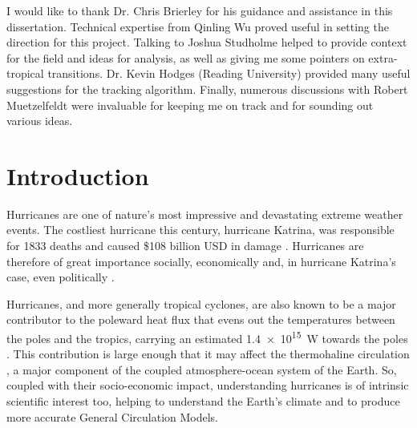 \documentclass[pdftex,12pt,a4paper]{report}
\begin{document}
I would like to thank Dr. Chris Brierley for his guidance and assistance in this dissertation.
Technical expertise from Qinling Wu proved useful in setting the direction for this project.
Talking to Joshua Studholme helped to provide context for the field and ideas for analysis, as well
as giving me some pointers on extra-tropical transitions. %
Dr. Kevin Hodges (Reading University) provided many useful suggestions for the tracking algorithm.
Finally, numerous discussions with Robert Muetzelfeldt were invaluable for keeping me on track and
for sounding out various ideas.

\newpage

\tableofcontents

\chapter{Introduction}


Hurricanes are one of nature's most impressive and devastating extreme weather events. The costliest
hurricane this century, hurricane Katrina, was responsible for 1833 deaths and caused \$108
billion USD in damage \parencite{knabb2006tropical}. %
Hurricanes are therefore of great importance socially,
economically and, in hurricane Katrina's case, even politically \parencite{kellner2007katrina}.

Hurricanes, and more generally tropical cyclones, are also known to be a major contributor to the
poleward heat flux that evens out the temperatures between the poles and the tropics, carrying an
estimated \SI{1.4e15}{W} towards the poles \parencite{emanuelContribution2001}. This
contribution is large enough that it may affect the thermohaline circulation
\parencite{hu2009effect}, a major component of the coupled atmosphere-ocean system of the Earth. So,
coupled with their socio-economic impact, understanding hurricanes is of intrinsic scientific
interest too, helping to understand the Earth's climate and to produce more accurate General
Circulation Models.
\end{document}
